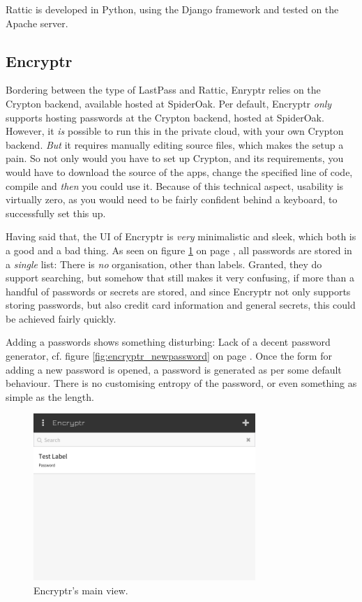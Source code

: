 			Rattic is developed in Python, using the Django framework and tested on the Apache server.



		\subsection{Encryptr}
			Bordering between the type of LastPass and Rattic, Enryptr \cite{encryptr} relies on the Crypton\cite{crypton} backend\cite{encryptr_backend}, available hosted at SpiderOak\cite{crypton_spideroak}. Per default, Encryptr \emph{only} supports hosting passwords at the Crypton backend, hosted at SpiderOak. However, it \emph{is} possible to run this in the private cloud, with your own Crypton backend. \emph{But} it requires manually editing source files\cite{encryptr_selfhost}, which makes the setup a pain. So not only would you have to set up Crypton, and its requirements, you would have to download the source of the apps, change the specified line of code, compile and \emph{then} you could use it. Because of this technical aspect, usability is virtually zero, as you would need to be fairly confident behind a keyboard, to successfully set this up.

			Having said that, the UI of Encryptr is \emph{very} minimalistic and sleek, which both is a good and a bad thing. As seen on figure \ref{fig:encryptr_main} on page \pageref{fig:encryptr_main}, all passwords are stored in a \emph{single} list: There is \emph{no} organisation, other than labels. Granted, they do support searching, but somehow that still makes it very confusing, if more than a handful of passwords or secrets are stored, and since Encryptr not only supports storing passwords, but also credit card information and general secrets, this could be achieved fairly quickly.

			Adding a passwords shows something disturbing: Lack of a decent password generator, cf. figure \ref{fig:encryptr_newpassword} on page \pageref{fig:encryptr_newpassword}. Once the form for adding a new password is opened, a password is generated as per some default behaviour. There is no customising entropy of the password, or even something as simple as the length.

			\begin{figure}[htbp]
				\centering
				\includegraphics[width=0.75\textwidth]{figures/analysis/encryptr_main.png}
				\caption{Encryptr's main view.}
				\label{fig:encryptr_main}
			\end{figure}


